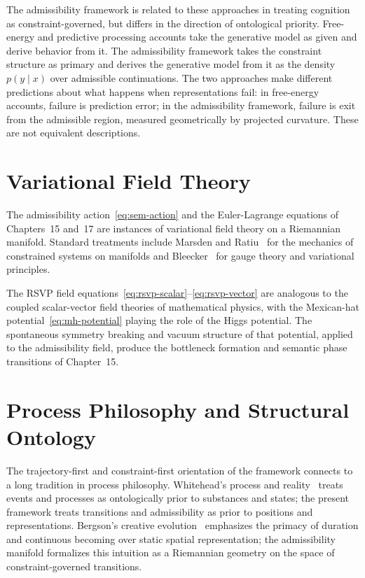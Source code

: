\documentclass[12pt, oneside]{book}
\theoremstyle{plain-flyxion}
\theoremstyle{definition-flyxion}
\begin{document}
The admissibility framework is related to these approaches in treating cognition as
constraint-governed, but differs in the direction of ontological priority. Free-energy
and predictive processing accounts take the generative model as given and derive behavior
from it. The admissibility framework takes the constraint structure as primary and derives
the generative model from it as the density $p(y \mid x)$ over admissible continuations.
The two approaches make different predictions about what happens when representations
fail: in free-energy accounts, failure is prediction error; in the admissibility
framework, failure is exit from the admissible region, measured geometrically by
projected curvature. These are not equivalent descriptions.

\section{Variational Field Theory}

The admissibility action~\eqref{eq:sem-action} and the Euler-Lagrange equations of
Chapters~15 and~17 are instances of variational field theory on a Riemannian manifold.
Standard treatments include Marsden and Ratiu~\cite{marsden1999} for the mechanics of
constrained systems on manifolds and Bleecker~\cite{bleecker1981} for gauge theory and
variational principles.

The RSVP field equations~\eqref{eq:rsvp-scalar}--\eqref{eq:rsvp-vector} are analogous
to the coupled scalar-vector field theories of mathematical physics, with the Mexican-hat
potential~\eqref{eq:mh-potential} playing the role of the Higgs potential. The
spontaneous symmetry breaking and vacuum structure of that potential, applied to the
admissibility field, produce the bottleneck formation and semantic phase transitions of
Chapter~15.

\section{Process Philosophy and Structural Ontology}

The trajectory-first and constraint-first orientation of the framework connects to a
long tradition in process philosophy. Whitehead's process and reality~\cite{whitehead1929}
treats events and processes as ontologically prior to substances and states; the present
framework treats transitions and admissibility as prior to positions and representations.
Bergson's creative evolution~\cite{bergson1911} emphasizes the primacy of duration and
continuous becoming over static spatial representation; the admissibility manifold
formalizes this intuition as a Riemannian geometry on the space of constraint-governed
transitions.
\end{document}
